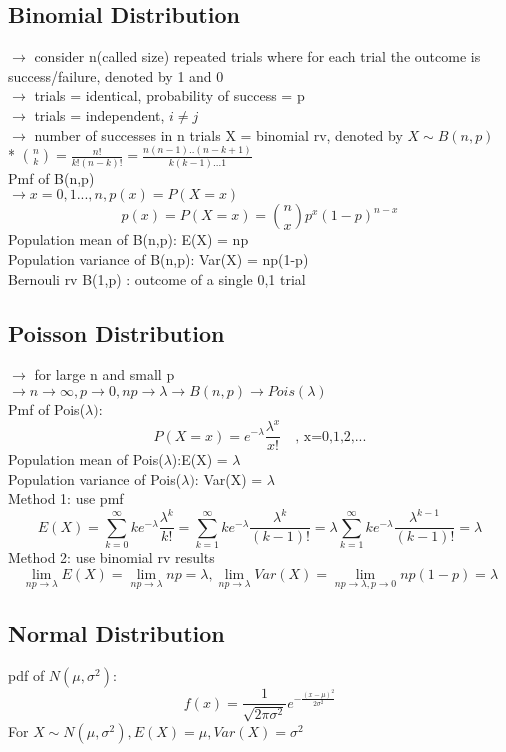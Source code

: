 \documentclass{article}
\begin{document}
\subsection{Binomial Distribution}
$\rightarrow$ consider n(called size) repeated trials where for each trial the outcome is success/failure, denoted by 1 and 0\\
$\rightarrow$ trials = identical, probability of success = p \\
$\rightarrow$ trials = independent, $i \neq j$\\
$\rightarrow$ number of successes in n trials X = binomial rv, denoted by $X\sim B(n,p)$\\
* $\binom{n}{k} = \frac{n!}{k!(n-k)!} = \frac{n(n-1)..(n-k+1)}{k(k-1)...1}$\\
Pmf of B(n,p)\\
$\rightarrow x=0,1...,n , p(x)=P(X=x)$\\
\[p(x) = P(X=x)=\binom{n}{x}p^x(1-p)^{n-x}\]
Population mean of B(n,p): E(X) = np\\
Population variance of B(n,p): Var(X) = np(1-p)\\
Bernouli rv B(1,p) : outcome of a single 0,1 trial\\
\subsection{Poisson Distribution}
$\rightarrow$ for large n and small p\\
$\rightarrow n \rightarrow \infty, p\rightarrow 0, np \rightarrow \lambda \rightarrow B(n,p) \rightarrow Pois(\lambda)$\\
Pmf of Pois($\lambda)$:\\
\[P(X=x)=e^{-\lambda}\frac{\lambda^x}{x!} \quad \text{, x=0,1,2,...}\]
Population mean of Pois($\lambda$):E(X) = $\lambda$\\
Population variance of Pois($\lambda)$: Var(X) = $\lambda$\\
Method 1: use pmf \[E(X) = \sum_{k=0}^{\infty}ke^{-\lambda}\frac{\lambda^k}{k!} = \sum_{k=1}^{\infty}ke^{-\lambda}\frac{\lambda^k}{(k-1)!} = \lambda \sum_{k=1}^{\infty}ke^{-\lambda}\frac{\lambda^{k-1}}{(k-1)!} = \lambda \]
Method 2: use binomial rv results \[\lim_{np \rightarrow \lambda}E(X) = \lim_{np \rightarrow \lambda}np =\lambda , \lim_{np \rightarrow \lambda}Var(X) = \lim_{np \rightarrow \lambda, p \rightarrow 0}np(1-p) = \lambda\]
\subsection{Normal Distribution}
pdf of $N(\mu, \sigma^2)$: \[f(x) = \frac{1}{\sqrt{2\pi\sigma^2}}e^{-\frac{(x-\mu)^2}{2\sigma^2}}\]
For $X \sim N(\mu,\sigma^2), E(X)=\mu, Var(X) = \sigma^2$
\end{document}
